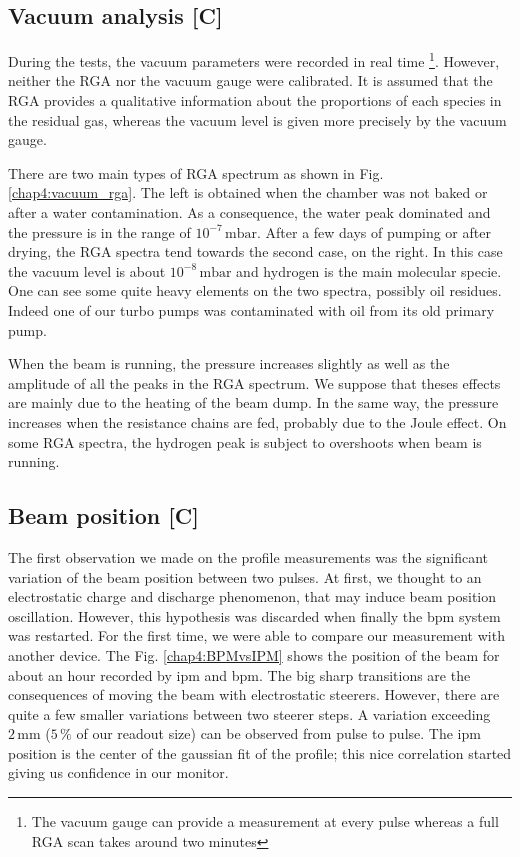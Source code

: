 \begin{refsection}
  \subsection{Vacuum analysis [C]}
  \label{sec4:vacuum}
  During the tests, the vacuum parameters were recorded in real time \footnote{The vacuum gauge can provide a measurement at every pulse whereas a full RGA scan takes around two minutes}. However, neither the RGA nor the vacuum gauge were calibrated. It is assumed that the RGA provides a qualitative information about the proportions of each species in the residual gas, whereas the vacuum level is given more precisely by the vacuum gauge.

  There are two main types of RGA spectrum as shown in Fig. \ref{chap4:vacuum_rga}. The left is obtained when the chamber was not baked or after a water contamination. As a consequence, the water peak dominated and the pressure is in the range of $10^{-7}\,\mathrm{mbar}$. After a few days of pumping or after drying, the RGA spectra tend towards the second case, on the right. In this case the vacuum level is about $10^{-8}\,\mathrm{mbar}$ and hydrogen is the main molecular specie. One can see some quite heavy elements on the two spectra, possibly oil residues. Indeed one of our turbo pumps was contaminated with oil from its old primary pump.

  

  When the beam is running, the pressure increases slightly as well as the amplitude of all the peaks in the RGA spectrum. We suppose that theses effects are mainly due to the heating of the beam dump. In the same way, the pressure increases when the resistance chains are fed, probably due to the Joule effect. On some RGA spectra, the hydrogen peak is subject to overshoots when beam is running.

  \subsection{Beam position [C]}
  \label{chap4:sec:Position}

  The first observation we made on the profile measurements was the significant variation of the beam position between two pulses. At first, we thought to an electrostatic charge and discharge phenomenon, that may induce beam position oscillation. However, this hypothesis was discarded when finally the \acrshort{bpm} system was restarted. For the first time, we were able to compare our measurement with another device. The Fig. \ref{chap4:BPMvsIPM} shows the position of the beam for about an hour recorded by \acrshort{ipm} and \acrshort{bpm}. The big sharp transitions are the consequences of moving the beam with electrostatic steerers. However, there are quite a few smaller variations between two steerer steps. A variation exceeding $2\,\mathrm{mm}$ ($5\,\mathrm{\%}$ of our readout size) can be observed from pulse to pulse. The \acrshort{ipm} position is the center of the gaussian fit of the profile; this nice correlation started giving us confidence in our monitor.


\end{refsection}
